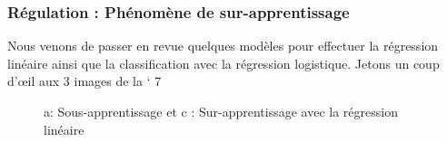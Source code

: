 \subsubsection{Régulation : Phénomène de sur-apprentissage}
Nous venons de passer en revue quelques modèles pour  effectuer la régression linéaire ainsi que la classification avec la régression logistique.
Jetons un coup d'œil aux 3 images de la `\figurename{ 7 }  \\
\begin{figure}[ht]
	\centering
	\hfill
	\hfill
	\caption{a: Sous-apprentissage et c : Sur-apprentissage avec la régression linéaire}
\end{figure}
